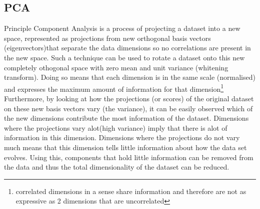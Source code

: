 \documentclass[twocolumn]{article}
\begin{document}
\subsection{PCA}
Principle Component Analysis is a process of projecting a dataset into a new space, represented as projections
from new orthogonal basis vectors (eigenvectors)that separate the data dimensions so no correlations are present in the new
space. Such a technique can be used to rotate a dataset onto this new completely 
othogonal space with zero mean and unit variance (whitening transform\cite{whitening}). Doing so means that each dimension
is in the same scale (normalised) and expresses the maximum amount of information for that dimension\footnote{correlated dimensions
in a sense share information and therefore are not as expressive as 2 dimensions that are uncorrelated}
Furthermore, by looking at how the projections (or scores) of the original dataset on these new basis vectors vary (the variance), it can be
easily observed which of the new dimensions contribute the most information of the dataset. Dimensions where the projections
vary alot(high variance) imply that there is alot of information in this dimension. Dimensions where the projections do not
vary much means that this dimension tells little information about how the data set evolves. Using this, components that
hold little information can be removed from the data and thus the total dimensionality of the dataset can be reduced. 
\end{document}

